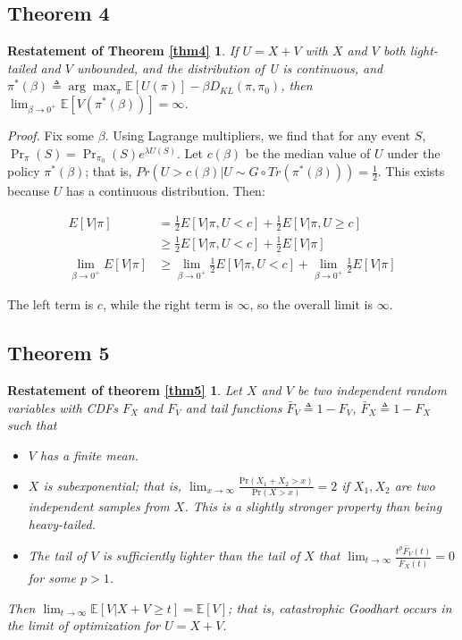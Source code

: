 \documentclass{article}
\begin{document}
\subsection{Theorem 4}

\newtheorem*{theorem4}{Restatement of Theorem \ref{thm4}}
\begin{theorem4}
    If \(U=X+V\) with \(X\) and \(V\) both
    light-tailed and \(V\) unbounded, and the distribution of U is continuous, and
    \(\pi^*(\beta) \triangleq \arg \max_\pi \mathbb E[U(\pi)] - \beta D_{KL}(\pi, \pi_0)\),
    then \(\lim_{\beta \to 0^+} \mathbb E[V(\pi^*(\beta))] = \infty\).
\end{theorem4}

\emph{Proof.} Fix some \(\beta\). Using Lagrange multipliers, we find
that for any event \(S\),
\(\Pr_\pi(S) = \Pr_{\pi_0}(S) e^{\lambda U(S)}\). Let \(c(\beta)\) be
the median value of \(U\) under the policy \(\pi^*(\beta)\); that is,
\(Pr(U > c(\beta) | U \sim G \circ Tr(\pi^*(\beta))) = \frac 1 2.\) This
exists because \(U\) has a continuous distribution. Then:

\begin{align*}E[V | \pi] &= \frac 1 2 E[V | \pi, U < c] + \frac 1 2 E[V | \pi, U \ge c]
\\ &\ge \frac 1 2 E[V | \pi, U < c] + \frac 1 2 E[V | \pi]
\\ \lim_{\beta \to 0^+} E[V | \pi] &\ge \lim_{\beta \to 0^+} \frac 1 2 E[V | \pi, U < c] + \lim_{\beta \to 0^+} \frac 1 2 E[V | \pi]
\end{align*}

The left term is \(c\), while the right term is \(\infty\), so the
overall limit is \(\infty\).

\subsection{Theorem 5}

\newtheorem*{theorem5}{Restatement of theorem {\ref{thm5}}}
\begin{theorem5}
    Let $X$ and $V$ be two independent random variables with CDFs $F_X$ and $F_V$ and tail functions $\bar F_V \triangleq 1 - F_V$, $\bar F_X \triangleq 1 - F_X$ such that
    \begin{itemize}
        \item $V$ has a finite mean.
        \item $X$ is subexponential; that is, $\lim_{x\to\infty}\frac{\text{Pr}(X_1+X_2>x)}{\text{Pr}(X>x)} = 2$ if $X_1, X_2$ are two independent samples from $X$. This is a slightly stronger property than being heavy-tailed.
        \item The tail of $V$ is sufficiently lighter than the tail of $X$ that \(\lim_{t\to\infty}\frac{t^p\bar F_V(t)}{\bar F_X(t)} = 0\) for some \(p > 1\).
    \end{itemize}
    Then $\lim_{t \to \infty} \mathbb E[V | X + V \ge t] =\mathbb{E}[V]$; that is, catastrophic Goodhart occurs in the limit of optimization for $U=X+V$.
\end{theorem5}
\end{document}
